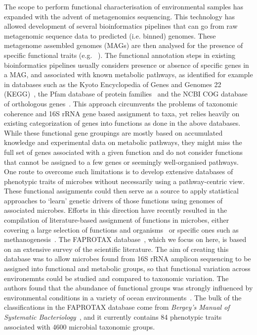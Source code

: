 \documentclass[10pt,letterpaper]{article}
\begin{document}
The scope to perform functional characterisation of environmental samples has expanded with the advent of metagenomics sequencing. This technology has allowed development of several bioinformatics pipelines that can go from raw metagenomic sequence data to predicted (i.e. binned) genomes. These metagenome assembled genomes (MAGs) are then analysed for the presence of specific functional traits (e.g. ~\cite{Narayanasamy2016}). The functional annotation steps in existing bioinformatics pipelines usually considers presence or absence of specific genes in a MAG, and associated with known metabolic pathways, as identified for example in databases such as the Kyoto
Encyclopedia of Genes and Genomes 22 (KEGG)~\cite{Kanehisa2017}, the Pfam database of protein families~\cite{Finn2016} and the NCBI COG database of orthologous genes~\cite{Tatusov1997}. This approach circumvents the
problems of taxonomic coherence and 16S rRNA gene based assignment to taxa, yet relies heavily on existing categorization of genes into functions as done in the above databases. While these
functional gene groupings are mostly based on accumulated knowledge and experimental
data on metabolic pathways, they might miss the full set of genes associated with a given
function and do not consider functions that cannot be assigned to a few genes or seemingly
well-organised pathways. One route to overcome such limitations is to
develop extensive databases of phenotypic traits of microbes without necessarily using a
pathway-centric view. These functional assignments could then serve as a source to apply
statistical approaches to `learn' genetic drivers of those functions
using genomes of associated microbes. Efforts in this direction have recently resulted in
the compilation of literature-based assignment of functions in microbes, either covering a large selection of functions and organisms~\cite{Louca2016,Louca2017} or specific ones such as methanogenesis~\cite{ukaszewicz2015}. The FAPROTAX database~\cite{Louca2016}, which we focus on here, is based on an extensive survey of the scientific literature. 
The aim of creating this database was to allow microbes found from 16S rRNA amplicon sequencing to be assigned into functional and metabolic groups, so that functional variation across environemnts could be studied and compared to taxonomic variation. The authors found that the abundance of functional groups was strongly influenced by environmental conditions in a variety of ocean environments~\cite{Louca2016a}. The bulk of the classifications in the FAPROTAX database come from \emph{Bergey's Manual of Systematic Bacteriology}~\cite{Whitman}, and it currently contains 84 phenotypic traits associated with 4600 microbial taxonomic groups.
\end{document}
